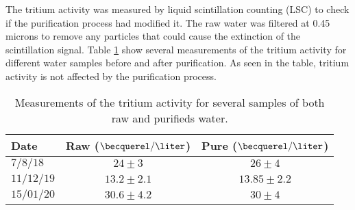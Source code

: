 
The tritium activity was measured by liquid scintillation counting (LSC) to check if the purification process had modified it. The raw water was filtered at 0.45 microns to remove any particles that could cause the extinction of the scintillation signal. Table \ref{tab:ActivityTritiumValues} show several measurements of the tritium activity for different water samples before and after purification. As seen in the table, tritium activity is not affected by the purification process.

\begin{table}[htbp]
\centering{}%
\begin{tabular}{lcc}
\toprule 
Date & Raw ($\becquerel/\liter$) & Pure ($\becquerel/\liter$) \tabularnewline
\midrule
\midrule 
$7/8/18$ & $24 \pm 3$ & $26 \pm 4$ \tabularnewline
$11/12/19$ & $13.2 \pm 2.1$ & $13.85 \pm 2.2$ \tabularnewline
$15/01/20$ & $30.6 \pm 4.2$ & $30 \pm 4$ \tabularnewline
\bottomrule
\end{tabular}
\caption{Measurements of the tritium activity for several samples of both raw and purifieds water.}
\label{tab:ActivityTritiumValues}
\end{table}